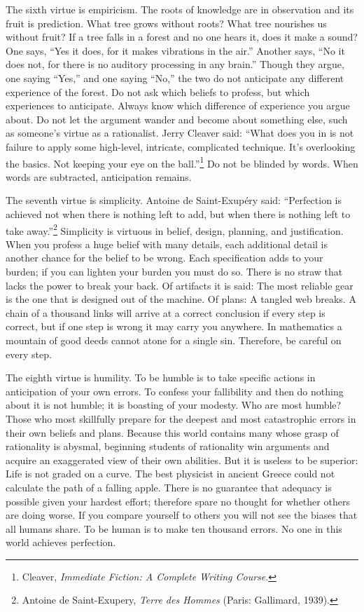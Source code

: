 {
 The sixth virtue is empiricism. The roots of knowledge are in
observation and its fruit is prediction. What tree grows without roots?
What tree nourishes us without fruit? If a tree falls in a forest and
no one hears it, does it make a sound? One says, ``Yes
it does, for it makes vibrations in the air.''
Another says, ``No it does not, for there is no
auditory processing in any brain.'' Though they
argue, one saying ``Yes,'' and one
saying ``No,'' the two do not
anticipate any different experience of the forest. Do not ask which
beliefs to profess, but which experiences to anticipate. Always know
which difference of experience you argue about. Do not let the argument
wander and become about something else, such as
someone's virtue as a rationalist. Jerry Cleaver said:
``What does you in is not failure to apply some
high-level, intricate, complicated technique. It's
overlooking the basics. Not keeping your eye on the
ball.''\footnote{Cleaver, \textit{Immediate Fiction: A Complete Writing
Course}.} Do not be blinded by
words. When words are subtracted, anticipation remains.}

{
 The seventh virtue is simplicity. Antoine de Saint-Exupéry said:
``Perfection is achieved not when there is nothing
left to add, but when there is nothing left to take
away.''\footnote{Antoine de Saint-Exupery, \textit{Terre des Hommes} (Paris:
Gallimard, 1939).} Simplicity is virtuous in
belief, design, planning, and justification. When you profess a huge
belief with many details, each additional detail is another chance for
the belief to be wrong. Each specification adds to your burden; if you
can lighten your burden you must do so. There is no straw that lacks
the power to break your back. Of artifacts it is said: The most
reliable gear is the one that is designed out of the machine. Of plans:
A tangled web breaks. A chain of a thousand links will arrive at a
correct conclusion if every step is correct, but if one step is wrong
it may carry you anywhere. In mathematics a mountain of good deeds
cannot atone for a single sin. Therefore, be careful on every step.}

{
 The eighth virtue is humility. To be humble is to take specific
actions in anticipation of your own errors. To confess your fallibility
and then do nothing about it is not humble; it is boasting of your
modesty. Who are most humble? Those who most skillfully prepare for the
deepest and most catastrophic errors in their own beliefs and plans.
Because this world contains many whose grasp of rationality is abysmal,
beginning students of rationality win arguments and acquire an
exaggerated view of their own abilities. But it is useless to be
superior: Life is not graded on a curve. The best physicist in ancient
Greece could not calculate the path of a falling apple. There is no
guarantee that adequacy is possible given your hardest effort;
therefore spare no thought for whether others are doing worse. If you
compare yourself to others you will not see the biases that all humans
share. To be human is to make ten thousand errors. No one in this world
achieves perfection.}

